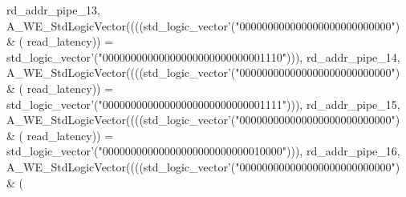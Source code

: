 \begin{DoxyCode}
{      rd_addr_pipe_13}\textcolor{vhdlchar}{,} \textcolor{vhdlchar}{A\_WE\_StdLogicVector}\textcolor{vhdlchar}{(}\textcolor{vhdlchar}{(}\textcolor{vhdlchar}{(}\textcolor{vhdlchar}{(}\textcolor{comment}{std\_logic\_vector}\textcolor{vhdlchar}{'}\textcolor{vhdlchar}{(}\textcolor{vhdllogic}{"000000000000000000000000000"}\textcolor{vhdlchar}{)} \textcolor{vhdlchar}{&} \textcolor{vhdlchar}{(}\textcolor{vhdlchar}{
      read_latency}\textcolor{vhdlchar}{)}\textcolor{vhdlchar}{)} \textcolor{vhdlchar}{=} \textcolor{comment}{std\_logic\_vector}\textcolor{vhdlchar}{'}\textcolor{vhdlchar}{(}\textcolor{vhdllogic}{"00000000000000000000000000001110"}\textcolor{vhdlchar}{)}\textcolor{vhdlchar}{)}\textcolor{vhdlchar}{)}\textcolor{vhdlchar}{,} \textcolor{vhdlchar}{
      rd_addr_pipe_14}\textcolor{vhdlchar}{,} \textcolor{vhdlchar}{A\_WE\_StdLogicVector}\textcolor{vhdlchar}{(}\textcolor{vhdlchar}{(}\textcolor{vhdlchar}{(}\textcolor{vhdlchar}{(}\textcolor{comment}{std\_logic\_vector}\textcolor{vhdlchar}{'}\textcolor{vhdlchar}{(}\textcolor{vhdllogic}{"000000000000000000000000000"}\textcolor{vhdlchar}{)} \textcolor{vhdlchar}{&} \textcolor{vhdlchar}{(}\textcolor{vhdlchar}{
      read_latency}\textcolor{vhdlchar}{)}\textcolor{vhdlchar}{)} \textcolor{vhdlchar}{=} \textcolor{comment}{std\_logic\_vector}\textcolor{vhdlchar}{'}\textcolor{vhdlchar}{(}\textcolor{vhdllogic}{"00000000000000000000000000001111"}\textcolor{vhdlchar}{)}\textcolor{vhdlchar}{)}\textcolor{vhdlchar}{)}\textcolor{vhdlchar}{,} \textcolor{vhdlchar}{
      rd_addr_pipe_15}\textcolor{vhdlchar}{,} \textcolor{vhdlchar}{A\_WE\_StdLogicVector}\textcolor{vhdlchar}{(}\textcolor{vhdlchar}{(}\textcolor{vhdlchar}{(}\textcolor{vhdlchar}{(}\textcolor{comment}{std\_logic\_vector}\textcolor{vhdlchar}{'}\textcolor{vhdlchar}{(}\textcolor{vhdllogic}{"000000000000000000000000000"}\textcolor{vhdlchar}{)} \textcolor{vhdlchar}{&} \textcolor{vhdlchar}{(}\textcolor{vhdlchar}{
      read_latency}\textcolor{vhdlchar}{)}\textcolor{vhdlchar}{)} \textcolor{vhdlchar}{=} \textcolor{comment}{std\_logic\_vector}\textcolor{vhdlchar}{'}\textcolor{vhdlchar}{(}\textcolor{vhdllogic}{"00000000000000000000000000010000"}\textcolor{vhdlchar}{)}\textcolor{vhdlchar}{)}\textcolor{vhdlchar}{)}\textcolor{vhdlchar}{,} \textcolor{vhdlchar}{
      rd_addr_pipe_16}\textcolor{vhdlchar}{,} \textcolor{vhdlchar}{A\_WE\_StdLogicVector}\textcolor{vhdlchar}{(}\textcolor{vhdlchar}{(}\textcolor{vhdlchar}{(}\textcolor{vhdlchar}{(}\textcolor{comment}{std\_logic\_vector}\textcolor{vhdlchar}{'}\textcolor{vhdlchar}{(}\textcolor{vhdllogic}{"000000000000000000000000000"}\textcolor{vhdlchar}{)} \textcolor{vhdlchar}{&} \textcolor{vhdlchar}{(}\textcolor{vhdlchar}{
}
\end{DoxyCode}

